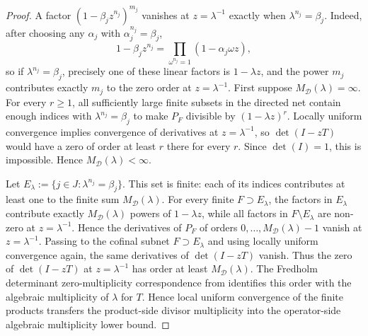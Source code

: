 \begin{proof}
  A factor \((1-\beta_jz^{n_j})^{m_j}\) vanishes at \(z=\lambda^{-1}\)
  exactly when \(\lambda^{n_j}=\beta_j\). Indeed, after choosing any
  \(\alpha_j\) with \(\alpha_j^{n_j}=\beta_j\),
  \[
    1-\beta_jz^{n_j}
    =\prod_{\omega^{n_j}=1}(1-\alpha_j\omega z),
  \]
  so if \(\lambda^{n_j}=\beta_j\), precisely one of these linear factors
  is \(1-\lambda z\), and the power \(m_j\) contributes exactly \(m_j\) to
  the zero order at \(z=\lambda^{-1}\). First suppose
  \(M_{\mathcal D}(\lambda)=\infty\). For every \(r\ge1\), all sufficiently
  large finite subsets in the directed net contain enough indices with
  \(\lambda^{n_j}=\beta_j\) to make \(P_F\) divisible by
  \((1-\lambda z)^r\). Locally uniform convergence implies convergence of
  derivatives at \(z=\lambda^{-1}\), so \(\det(I-zT)\) would have a zero
  of order at least \(r\) there for every \(r\). Since
  \(\det(I)=1\), this is impossible. Hence
  \(M_{\mathcal D}(\lambda)<\infty\).

  Let \(E_\lambda:=\{j\in J:\lambda^{n_j}=\beta_j\}\). This set is finite:
  each of its indices contributes at least one to the finite sum
  \(M_{\mathcal D}(\lambda)\). For every finite \(F\supset E_\lambda\),
  the factors in \(E_\lambda\) contribute exactly
  \(M_{\mathcal D}(\lambda)\) powers of \(1-\lambda z\), while all factors
  in \(F\setminus E_\lambda\) are non-zero at \(z=\lambda^{-1}\). Hence
  the derivatives of \(P_F\) of orders
  \(0,\ldots,M_{\mathcal D}(\lambda)-1\) vanish at \(z=\lambda^{-1}\).
  Passing to the cofinal subnet \(F\supset E_\lambda\) and using locally
  uniform convergence again, the same derivatives of \(\det(I-zT)\) vanish.
  Thus the zero of \(\det(I-zT)\) at \(z=\lambda^{-1}\) has order at least
  \(M_{\mathcal D}(\lambda)\). The Fredholm determinant
  zero-multiplicity correspondence from
   identifies this order with the
  algebraic multiplicity of \(\lambda\) for \(T\). Hence local uniform
  convergence of the finite products transfers the product-side divisor
  multiplicity into the operator-side algebraic multiplicity lower bound.
\end{proof}

